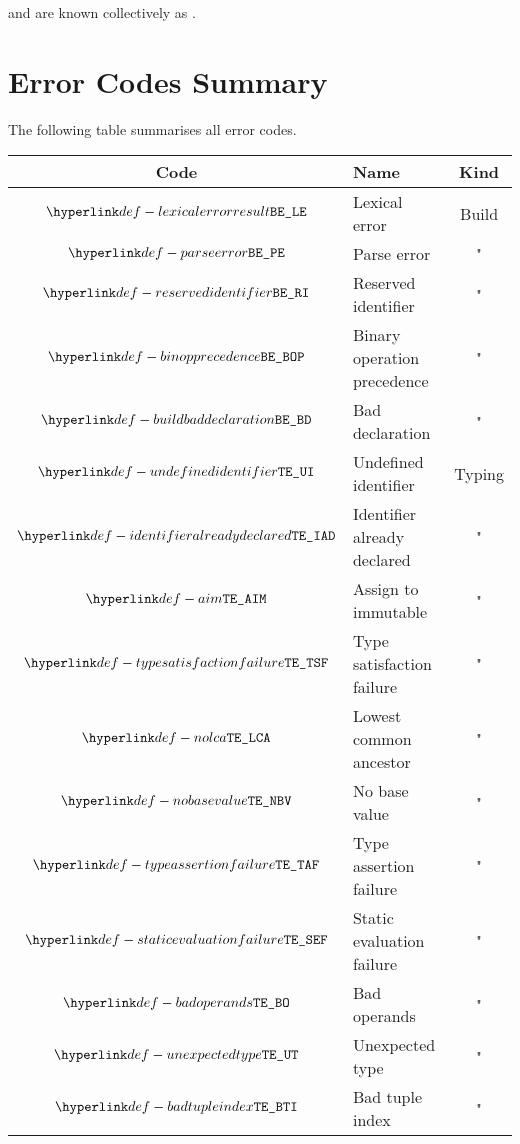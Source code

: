 \Builderrorsterm{} and \typingerrorsterm{} are known collectively as .

\section{Error Codes Summary\label{sec:ErrorCodesSummary}}
The following table summarises all error codes.

\begin{center}
\newcommand{\qq}{\symbol{34}} %
\begin{tabular}{clc}
\hline
\textbf{Code} & \textbf{Name} & \textbf{Kind} \\
\hline
  $\LexicalError$                & Lexical error                  & Build         \\
  $\ParseError$                  & Parse error                    & "             \\
  $\ReservedIdentifier$          & Reserved identifier            & "             \\
  $\BinopPrecedence$             & Binary operation precedence    & "             \\
  $\BuildBadDeclaration$         & Bad declaration                & "             \\
  \hline
  $\UndefinedIdentifier$         & Undefined identifier           & Typing        \\
  $\IdentifierAlreadyDeclared$   & Identifier already declared    & "             \\
  $\AssignmentToImmutable$       & Assign to immutable            & "             \\
  $\TypeSatisfactionFailure$     & Type satisfaction failure      & "             \\
  $\NoLCA$                       & Lowest common ancestor         & "             \\
  $\NoBaseValue$                 & No base value                  & "             \\
  $\TypeAssertionFailure$        & Type assertion failure         & "             \\
  $\StaticEvaluationFailure$     & Static evaluation failure      & "             \\
  $\BadOperands$                 & Bad operands                   & "             \\
  $\UnexpectedType$              & Unexpected type                & "             \\
  $\BadTupleIndex$               & Bad tuple index                & "             \\

\end{tabular}
\end{center}
